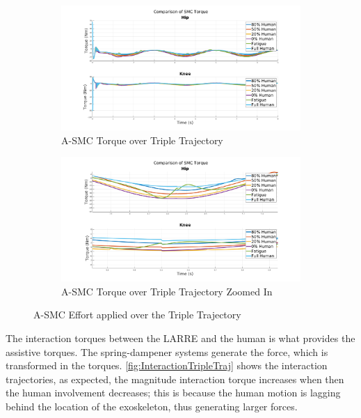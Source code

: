 \begin{figure}
    \begin{subfigure}{\linewidth}
        \centering
        \includegraphics[width=\columnwidth]{images/controllers/trajs/SMC_full.png}
        \caption[A-SMC Torque over Triple Trajectory]{A-SMC Torque over Triple Trajectory}
        \label{fig:SMCTripleFull}
    \end{subfigure}
    \begin{subfigure}{\linewidth}
        \centering
        \includegraphics[width=\columnwidth]{images/controllers/trajs/SMC_zoom.png}
        \caption[A-SMC Torque over Triple Trajectory Zoomed]{A-SMC Torque over Triple Trajectory Zoomed In}
        \label{fig:SMCTripleZoom}
    \end{subfigure}
    \caption{A-SMC Effort applied over the Triple Trajectory}
    \label{fig:SMCEffortTriple}
\end{figure}

The interaction torques between the LARRE and the human is what provides the assistive torques. The spring-dampener systems generate the force, which is transformed in the torques. \autoref{fig:InteractionTripleTraj} shows the interaction trajectories, as expected, the magnitude interaction torque increases when then the human involvement decreases; this is because the human motion is lagging behind the location of the exoskeleton, thus generating larger forces. 

